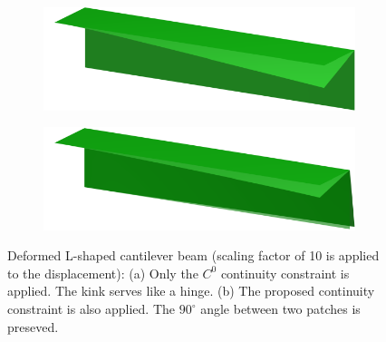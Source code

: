 \documentclass[preprint,12pt]{elsarticle}
\theoremstyle{remark}
\begin{document}
\begin{figure}[!hbt]
    \centering
    \captionsetup[subfigure]{font = footnotesize}
    \begin{subfigure}[b]{.49\textwidth}
        \centering
        \includegraphics[width = \textwidth]{L-beam-c0_result}
        \caption{}\label{fig:L-beam-deform-c0}
    \end{subfigure}
    \begin{subfigure}[b]{.49\textwidth}
        \centering
        \includegraphics[width = \textwidth]{L-beam-c1_result}
        \caption{}\label{fig:L-beam-deform-c1}
    \end{subfigure}
	\caption{Deformed L-shaped cantilever beam (scaling factor of 10 is applied to the displacement): (a) Only the $C^0$ continuity constraint is applied. The kink serves like a hinge. (b) The proposed continuity constraint is also applied. The $90^\circ$ angle between two patches is preseved.}\label{fig:L-beam-deform}
\end{figure}
\end{document}
